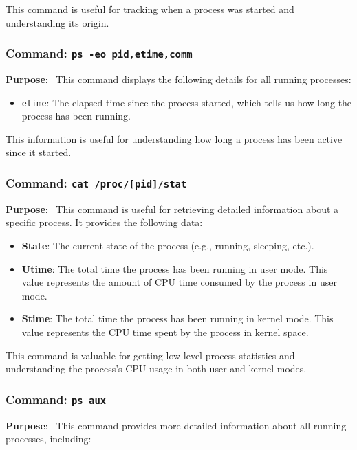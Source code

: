 \documentclass[12pt]{article}
\begin{document}
This command is useful for tracking when a process was started and understanding its origin.

\subsubsection{Command: \texttt{ps -eo pid,etime,comm}}

\textbf{Purpose}: \
This command displays the following details for all running processes:

\begin{itemize}
    \item \texttt{etime}: The elapsed time since the process started, which tells us how long the process has been running.
\end{itemize}

This information is useful for understanding how long a process has been active since it started.

\subsubsection{Command: \texttt{cat /proc/[pid]/stat}}

\textbf{Purpose}: \
This command is useful for retrieving detailed information about a specific process. It provides the following data:

\begin{itemize}
    \item \textbf{State}: The current state of the process (e.g., running, sleeping, etc.).
    \item \textbf{Utime}: The total time the process has been running in user mode. This value represents the amount of CPU time consumed by the process in user mode.
    \item \textbf{Stime}: The total time the process has been running in kernel mode. This value represents the CPU time spent by the process in kernel space.
\end{itemize}

This command is valuable for getting low-level process statistics and understanding the process's CPU usage in both user and kernel modes.

\subsubsection{Command: \texttt{ps aux}}

\textbf{Purpose}: \
This command provides more detailed information about all running processes, including:
\end{document}
